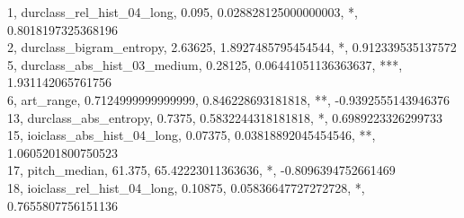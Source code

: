 1, durclass_rel_hist_04_long, 0.095, 0.028828125000000003, *, 0.8018197325368196\\
2, durclass_bigram_entropy, 2.63625, 1.8927485795454544, *, 0.912339535137572\\
5, durclass_abs_hist_03_medium, 0.28125, 0.06441051136363637, ***, 1.931142065761756\\
6, art_range, 0.7124999999999999, 0.846228693181818, **, -0.9392555143946376\\
13, durclass_abs_entropy, 0.7375, 0.5832244318181818, *, 0.6989223326299733\\
15, ioiclass_abs_hist_04_long, 0.07375, 0.03818892045454546, **, 1.0605201800750523\\
17, pitch_median, 61.375, 65.42223011363636, *, -0.8096394752661469\\
18, ioiclass_rel_hist_04_long, 0.10875, 0.05836647727272728, *, 0.7655807756151136\\
